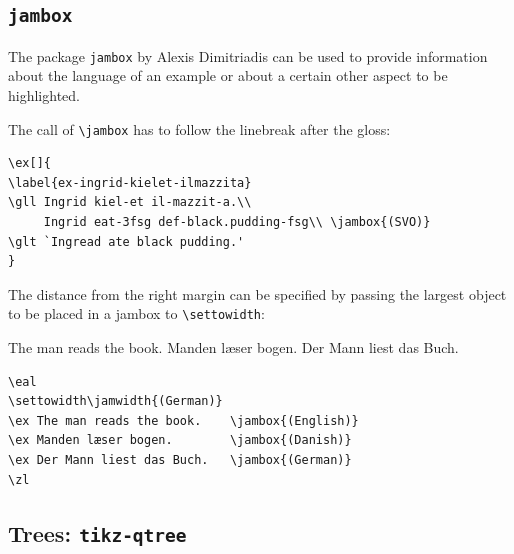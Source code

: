\subsection{\texttt{jam\-box}}
\label{sec-jambox}


The package \texttt{jambox} by Alexis Dimitriadis can be used to provide information about the language of an example or
about a certain other aspect to be highlighted.
\settowidth{}
\eal
{}
\zl

The call of \verb+\jambox+ has to follow the linebreak after the gloss:
\begin{verbatim}
\ex[]{
\label{ex-ingrid-kielet-ilmazzita}
\gll Ingrid kiel-et il-mazzit-a.\\
     Ingrid eat-3fsg def-black.pudding-fsg\\ \jambox{(SVO)}
\glt `Ingread ate black pudding.'
}
\end{verbatim}
The distance from the right margin can be specified by passing the largest object to be placed in a
jambox to \verb+\settowidth+:

\eal
\settowidth{}
\ex The man reads the book.    
\ex Manden læser bogen.        
\ex Der Mann liest das Buch.   
\zl

\begin{verbatim}
\eal
\settowidth\jamwidth{(German)}
\ex The man reads the book.    \jambox{(English)}
\ex Manden læser bogen.        \jambox{(Danish)}
\ex Der Mann liest das Buch.   \jambox{(German)}
\zl
\end{verbatim}



\subsection{Trees: \texttt{tikz-qtree}}

